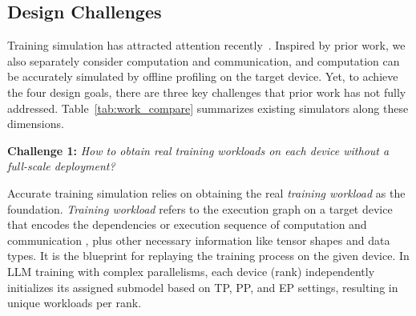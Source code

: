 \subsection{Design Challenges} 
\label{subsec:challenges}

\noindent Training simulation has attracted attention recently~\cite{SimAI2025NSDI,liang2025lumos,duan2024proteus,won2023astra}.
Inspired by prior work, we also separately consider computation and communication, and computation can be accurately simulated by offline profiling on the target device.
Yet, to achieve the four design goals, there are three key challenges that prior work has not fully addressed.
Table~\ref{tab:work_compare} summarizes existing simulators along these dimensions. %




\vspace{0.3em}
\noindent \textbf{Challenge 1:}
\textit{How to obtain real training workloads on each device without a full-scale deployment?}

Accurate training simulation relies on obtaining the real \textit{training workload} as the foundation.
\textit{Training workload} refers to the execution graph on a target device that encodes the dependencies or execution sequence of computation and communication \ops, plus other necessary information like tensor shapes and data types.
It is the blueprint for replaying the training process on the given device.
In LLM training with complex parallelisms, each device (rank) independently initializes its assigned submodel based on TP, PP, and EP settings, resulting in unique workloads per rank. 

